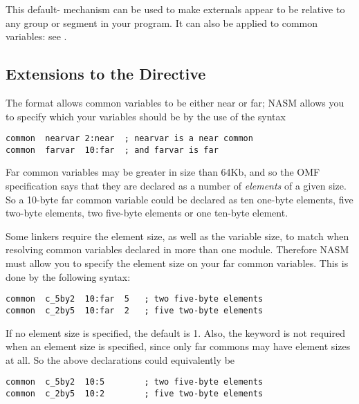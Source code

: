 This default- mechanism can be used
to make externals appear to be relative to any group or segment in
your program. It can also be applied to common variables: see
.

\subsection{ Extensions to the  Directive}
\label{subsec:objcommon}

The  format allows common variables to be either near
 or far;
NASM allows you to specify which your variables should be by the
use of the syntax

\begin{lstlisting}
common  nearvar 2:near  ; nearvar is a near common
common  farvar  10:far  ; and farvar is far
\end{lstlisting}

Far common variables may be greater in size than 64Kb, and so the
OMF specification says that they are declared as a number of
\emph{elements} of a given size. So a 10-byte far common variable could
be declared as ten one-byte elements, five two-byte elements, two
five-byte elements or one ten-byte element.

Some  linkers require the element size, as well as
the variable size, to match when resolving common variables declared
in more than one module. Therefore NASM must allow you to specify
the element size on your far common variables. This is done by the
following syntax:

\begin{lstlisting}
common  c_5by2  10:far  5   ; two five-byte elements
common  c_2by5  10:far  2   ; five two-byte elements
\end{lstlisting}

If no element size is specified, the default is 1. Also, the 
keyword is not required when an element size is specified, since
only far commons may have element sizes at all. So the above
declarations could equivalently be

\begin{lstlisting}
common  c_5by2  10:5        ; two five-byte elements
common  c_2by5  10:2        ; five two-byte elements
\end{lstlisting}

